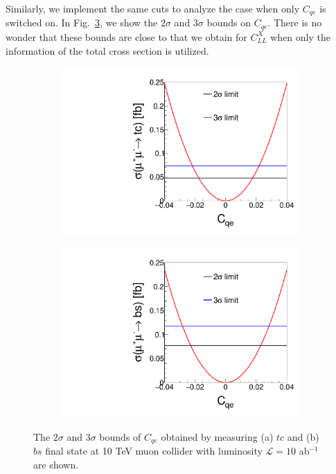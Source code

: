 \documentclass[a4paper,11pt]{article}
\begin{document}
Similarly, we implement the same cuts to analyze the case when only $C_{qe}$ is switched on. 
In Fig.~\ref{fig:cqe1d}, we show the $2\sigma$ and $3\sigma$ bounds on $C_{qe}$. 
There is no wonder that these bounds are close to that we obtain for $C^{X}_{LL}$ when only the information of the total cross section is utilized.

\begin{figure}[htbp]
  \centering
  \captionsetup[sub]{font=large}
  \begin{subfigure}[t]{0.45\textwidth}
     \includegraphics[width=\linewidth]{cqetc.pdf}
     \caption{}
     \label{fig:clltc1d}
  \end{subfigure}
  \begin{subfigure}[t]{0.45\textwidth}
     \includegraphics[width=\linewidth]{cqebs.pdf}
     \caption{}
     \label{fig:cllbs1d}
  \end{subfigure}
  \caption{The $2\sigma$ and $3\sigma$ bounds of $C_{qe}$ obtained by measuring (a) $tc$ and (b) $bs$ final state at 10 TeV muon collider with luminosity $\mathcal{L}=10$ ab$^{-1}$ are shown.}\label{fig:cqe1d}
\end{figure}
\end{document}
